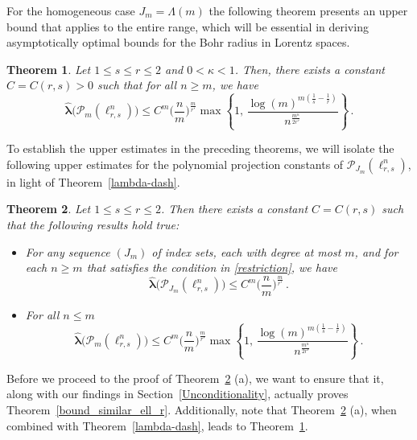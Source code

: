 \documentclass[12pt]{amsart}
\numberwithin{subsection}{section}
\newtheorem{theorem}{Theorem}[section]
\theoremstyle{definition}
\theoremstyle{remark}
\begin{document}
For the  homogeneous case $J_m= \Lambda(m)$ the following theorem presents an upper bound that applies to the entire range, which
will be essential in deriving asymptotically optimal bounds for the Bohr radius in Lorentz spaces.


\begin{theorem} \label{proj lorentz s<r}
Let  $1\le s \le r\le 2$ and $0<\kappa<1$. Then, there exists a constant $C=C(r, s)>0$ such that for all  $n\ge m$, we have
\begin{equation*}\label{proj lorentz s<r - bound}
\widehat{\boldsymbol{\lambda}}\big(\mathcal P_m(\ell_{r,s}^n)\big) \leq C^m \Big(\frac{n}{m}\Big)^{\frac{m}{r'}}
\max\left\{1,\,\frac{\log(m)^{m(\frac1{s}-\frac1{r})}}{n^{\frac{m^\kappa}{2r'}}}\right\}\,.
\end{equation*}
\end{theorem}


To establish the upper estimates in the preceding theorems, we will isolate the following upper estimates for the polynomial
projection constants of $\mathcal{P}_{J_m}(\ell_{r,s}^n)$, in light of Theorem~\ref{lambda-dash}.


\begin{theorem} \label{bound_similar_ell_rBBB}
Let  $1\le s \le r\le 2$. Then there exists a constant $C=C(r, s)$ such that the following results hold true:
\begin{itemize}
\item[(a)] For any sequence $(J_m)$ of index sets, each with degree at most $m$, and for each $n \geq m$ that satisfies
the condition in \eqref{restriction}, we have
\begin{equation*}
\widehat{\boldsymbol{\lambda}}\big(\mathcal P_{J_m}(\ell_{r,s}^n)\big) \le C^m \Big(\frac{n}{m} \Big)^{\frac{m}{r'}}\,.
\end{equation*}
\item[(b)] For all $n \leq m$
\begin{equation*}
\widehat{\boldsymbol{\lambda}}\big(\mathcal P_m(\ell_{r,s}^n)\big)
\le C^m \Big(\frac{n}{m}\Big)^{\frac{m}{r'}}
\max\left\{1,\,\frac{\log(m)^{m(\frac1{s}-\frac1{r})}}{n^{\frac{m^\kappa}{2r'}}}\right\}\,.
\end{equation*}
\end{itemize}
\end{theorem}


Before we proceed to the proof of Theorem~\ref{bound_similar_ell_rBBB} (a), we want to ensure that it, along with our findings
in Section~\ref{Unconditionality}, actually proves Theorem~\ref{bound_similar_ell_r}. Additionally, note that
Theorem~\ref{bound_similar_ell_rBBB} (a), when combined with Theorem~\ref{lambda-dash}, leads to Theorem~\ref{proj lorentz s<r}.
\end{document}
